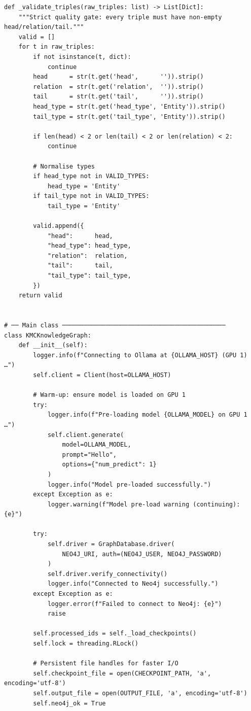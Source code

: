 \documentclass[11pt]{article}
\begin{document}
\begin{lstlisting}[style=pythoncode, caption={kg\_generator\_gpu\_1.py}]
def _validate_triples(raw_triples: list) -> List[Dict]:
    """Strict quality gate: every triple must have non-empty head/relation/tail."""
    valid = []
    for t in raw_triples:
        if not isinstance(t, dict):
            continue
        head      = str(t.get('head',      '')).strip()
        relation  = str(t.get('relation',  '')).strip()
        tail      = str(t.get('tail',      '')).strip()
        head_type = str(t.get('head_type', 'Entity')).strip()
        tail_type = str(t.get('tail_type', 'Entity')).strip()

        if len(head) < 2 or len(tail) < 2 or len(relation) < 2:
            continue

        # Normalise types
        if head_type not in VALID_TYPES:
            head_type = 'Entity'
        if tail_type not in VALID_TYPES:
            tail_type = 'Entity'

        valid.append({
            "head":      head,
            "head_type": head_type,
            "relation":  relation,
            "tail":      tail,
            "tail_type": tail_type,
        })
    return valid


# ── Main class ─────────────────────────────────────────────
class KMCKnowledgeGraph:
    def __init__(self):
        logger.info(f"Connecting to Ollama at {OLLAMA_HOST} (GPU 1) …")
        self.client = Client(host=OLLAMA_HOST)

        # Warm-up: ensure model is loaded on GPU 1
        try:
            logger.info(f"Pre-loading model {OLLAMA_MODEL} on GPU 1 …")
            self.client.generate(
                model=OLLAMA_MODEL,
                prompt="Hello",
                options={"num_predict": 1}
            )
            logger.info("Model pre-loaded successfully.")
        except Exception as e:
            logger.warning(f"Model pre-load warning (continuing): {e}")

        try:
            self.driver = GraphDatabase.driver(
                NEO4J_URI, auth=(NEO4J_USER, NEO4J_PASSWORD)
            )
            self.driver.verify_connectivity()
            logger.info("Connected to Neo4j successfully.")
        except Exception as e:
            logger.error(f"Failed to connect to Neo4j: {e}")
            raise

        self.processed_ids = self._load_checkpoints()
        self.lock = threading.RLock()
        
        # Persistent file handles for faster I/O
        self.checkpoint_file = open(CHECKPOINT_PATH, 'a', encoding='utf-8')
        self.output_file = open(OUTPUT_FILE, 'a', encoding='utf-8')
        self.neo4j_ok = True


\end{lstlisting}
\end{document}

